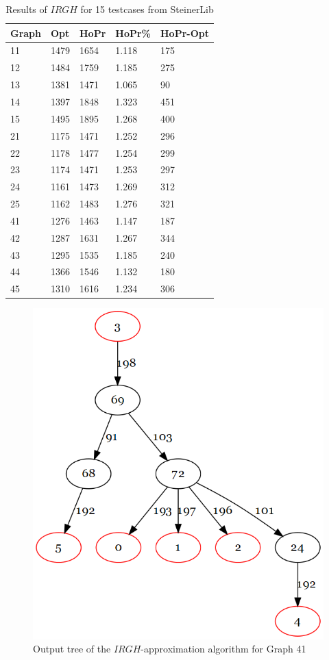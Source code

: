 \begin{table}[htbp]
 \caption{Results of $IRGH$ for 15 testcases from SteinerLib \cite{Dui93}}\label{tab:HoPrResults} 	
 \centering
 \begin{tabular}{l l l l l}
\toprule
Graph & Opt & HoPr & HoPr\% & HoPr-Opt \\
\midrule
11	& 1479	& 1654	& 1.118	& 175 \\
12	& 1484	& 1759	& 1.185	& 275 \\
13	& 1381	& 1471	& 1.065	& 90 \\
14	& 1397	& 1848	& 1.323	& 451 \\
15	& 1495	& 1895	& 1.268	& 400 \\
\midrule 
21	& 1175	& 1471	& 1.252	& 296 \\
22	& 1178	& 1477	& 1.254	& 299 \\
23	& 1174	& 1471	& 1.253	& 297 \\
24	& 1161	& 1473	& 1.269 	& 312 \\
25	& 1162	& 1483	& 1.276	& 321 \\
\midrule
41	& 1276	& 1463	& 1.147	& 187 \\
42	& 1287	& 1631	& 1.267	& 344 \\
43	& 1295	& 1535	& 1.185	& 240 \\
44	& 1366	& 1546	& 1.132	& 180 \\
45	& 1310	& 1616	& 1.234	& 306 \\
\bottomrule
\end{tabular}
\end{table}

\begin{figure}[htbp]
\centering
\includegraphics[scale=0.40]{figures/HougardyProemel.png}
\caption{Output tree of the $IRGH$-approximation algorithm for Graph 41}\label{fig:HoPrTree41}
\end{figure}
